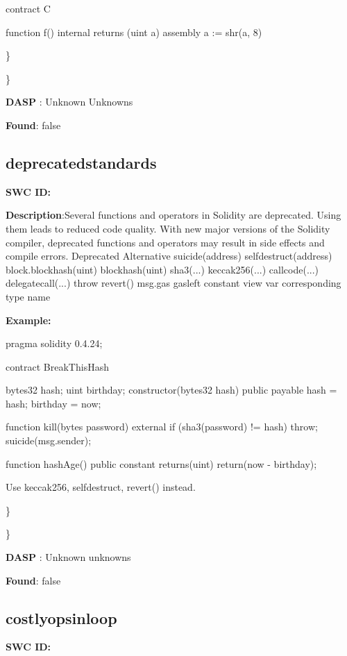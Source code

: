 \documentclass{article}
\begin{document}
contract C {
  function f() internal returns (uint a) {
    assembly {
        a := shr(a, 8)
    }
}

\} 

\} 

\textbf{DASP} : Unknown Unknowns

\textbf{Found}: false

\subsection{deprecated\textunderscore standards} 
\textbf{SWC \textunderscore ID:} 

\textbf{Description}:Several functions and operators in Solidity are deprecated. Using them leads to reduced code quality. With new major versions of the Solidity compiler, deprecated functions and operators may result in side effects and compile errors.
  Deprecated              Alternative
  suicide(address)        selfdestruct(address)
  block.blockhash(uint)   blockhash(uint)
  sha3(...)               keccak256(...)
  callcode(...)           delegatecall(...)
  throw                   revert()
  msg.gas                 gasleft
  constant                view
  var                     corresponding type name


\textbf{Example:} 

pragma solidity 0.4.24;

contract BreakThisHash {
    bytes32 hash;
    uint birthday;
    constructor(bytes32 \textunderscore hash) public payable {
        hash = \textunderscore hash;
        birthday = now;
    }

    function kill(bytes password) external {
        if (sha3(password) != hash) {
            throw;
        }
        suicide(msg.sender);
    }

    function hashAge() public constant returns(uint) {
        return(now - birthday);
    }
}

Use keccak256, selfdestruct, revert() instead.

\} 

\} 

\textbf{DASP} : Unknown unknowns

\textbf{Found}: false

\subsection{costly\textunderscore ops\textunderscore in\textunderscore loop} 
\textbf{SWC \textunderscore ID:} 

}
\end{document}

